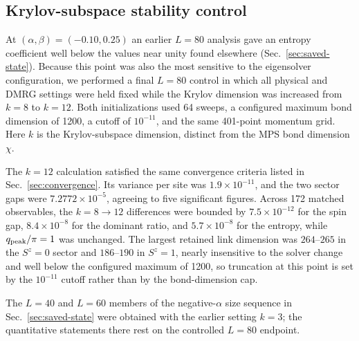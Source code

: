 \subsection{Krylov-subspace stability control}
\label{sec:krylov}

At $(\alpha,\beta)=(-0.10,0.25)$ an earlier $L=80$ analysis gave an entropy
coefficient well below the values near unity found elsewhere
(Sec.~\ref{sec:saved-state}).
Because this point was also the most sensitive to the eigensolver configuration,
we performed a final $L=80$ control in which all physical and DMRG settings were held fixed while the
Krylov dimension was increased from $k=8$ to $k=12$.
Both initializations used 64 sweeps, a configured maximum bond dimension of 1200,
a cutoff of $10^{-11}$, and the same 401-point momentum grid.
Here $k$ is the Krylov-subspace dimension, distinct from the MPS bond dimension
$\chi$.

The $k=12$ calculation satisfied the same convergence criteria listed in
Sec.~\ref{sec:convergence}.
Its variance per site was $1.9\times10^{-11}$, and the two sector gaps were
$7.2772\times10^{-5}$, agreeing to five significant figures.
Across 172 matched observables, the $k=8\rightarrow12$ differences were bounded by
$7.5\times10^{-12}$ for the spin gap, $8.4\times10^{-8}$ for the dominant
ratio, and $5.7\times10^{-8}$ for the entropy, while $q_{\mathrm{peak}}/\pi=1$ was
unchanged.
The largest retained link dimension was $264$--$265$ in the $S^z=0$ sector and
$186$--$190$ in $S^z=1$, nearly insensitive to the solver change and well below
the configured maximum of 1200, so truncation at this point is set by the
$10^{-11}$ cutoff rather than by the bond-dimension cap.

The $L=40$ and $L=60$ members of the negative-$\alpha$ size sequence in
Sec.~\ref{sec:saved-state} were obtained with the earlier setting $k=3$; the
quantitative statements there rest on the controlled $L=80$ endpoint.
